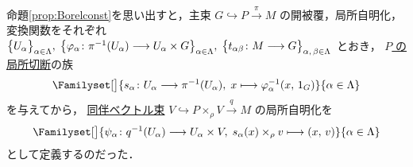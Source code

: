 \documentclass[geometry_main]{subfiles}
\begin{document}
命題\ref{prop:Borelconst}を思い出すと，主束 $G \hookrightarrow P \xrightarrow{\pi} M$ の開被覆，局所自明化，変換関数をそれぞれ $\bigl\{ U_\alpha \bigr\}_{\alpha \in \Lambda},\; \bigl\{ \varphi_\alpha \colon \pi^{-1}(U_\alpha) \longrightarrow U_\alpha \times G \bigr\}_{\alpha \in \Lambda},\; \bigl\{  t_{\alpha\beta} \colon M \longrightarrow G  \bigr\}_{\alpha,\, \beta \in \Lambda}$ とおき，
\underline{$P$ の}\hyperref[def.section]{局所切断}の族
\begin{align}
    \label{eq:assoc-sec}
    \Familyset[\big]{s_\alpha \colon U_\alpha \lto \pi^{-1}(U_\alpha),\; x \lmto \varphi_\alpha^{-1}(x,\, 1_G)}{\alpha \in \Lambda}
\end{align}
を与えてから，
\hyperref[def:associated-vect]{同伴ベクトル束} $V \hookrightarrow P \times_\rho V \xrightarrow{q} M$ の局所自明化を
\begin{align}
    \label{eq:assoc-loctriv}
    \Familyset[\big]{\psi_\alpha \colon q^{-1}(U_\alpha) \lto U_\alpha \times V,\; s_\alpha(x) \times_\rho v \lmto (x,\, v)}{\alpha \in \Lambda}
\end{align}
として定義するのだった．
\end{document}

